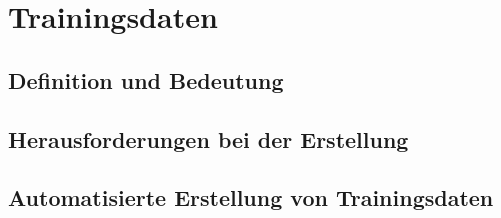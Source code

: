 \section{Trainingsdaten}

\subsection{Definition und Bedeutung}

\subsection{Herausforderungen bei der Erstellung}

\subsection{Automatisierte Erstellung von Trainingsdaten}